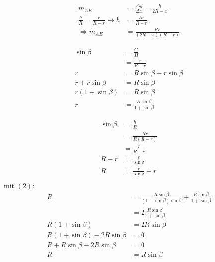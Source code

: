 \documentclass[12pt,a4paper,oneside]{article}
\begin{document}
\begin{align*}
	m_{AE} &= \frac{\Delta y}{\Delta x} = \frac{h}{2R-x} \\
	\frac{h}{R} = \frac{r}{R-r} \leftrightarrow h &= \frac{Rr}{R-r} \tag{1} \\
	\Rightarrow m_{AE} &= \frac{Rr}{(2R-x)(R-r)}
\end{align*}

\begin{align*}
	\sin\beta &= \frac{G}{H} \tag{nötig? ausschreiben?} \\
	&= \frac{r}{R-r} \\
	r &= R \sin\beta - r \sin\beta \\
	r + r \sin\beta &= R \sin\beta \\
	r(1+\sin\beta) &= R \sin\beta \\
	r &= \frac{R \sin\beta}{1 + \sin\beta} \tag{2}
\end{align*}

\begin{align*}
	\sin\beta &= \frac{h}{R} \\
	&= \frac{Rr}{R(R-r)} \\
	&= \frac{r}{R-r} \\
	R-r &= \frac{r}{\sin\beta} \\
	R &= \frac{r}{\sin\beta}+r \\
\end{align*}
mit $(2)$:
\begin{align*}
	R &= \frac{R \sin\beta}{(1+ \sin\beta) \sin\beta} + \frac{R \sin\beta}{1 + \sin\beta} \\
	&= 2 \frac{R \sin\beta}{1 + \sin\beta} \\
	R(1 + \sin\beta) &= 2 R \sin\beta \\
	R(1 + \sin\beta) - 2 R \sin\beta &= 0 \\
	R + R \sin\beta - 2 R \sin\beta &= 0 \\
	R &= R \sin\beta
\end{align*}
\end{document}
